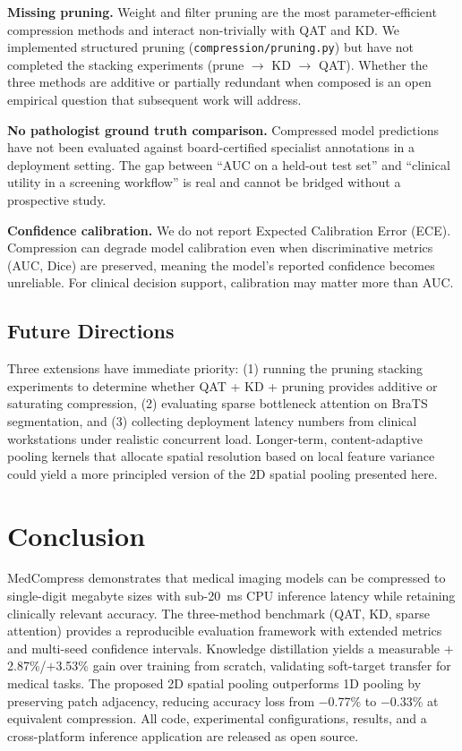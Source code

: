 \documentclass[10pt,twocolumn]{article}
\begin{document}
\textbf{Missing pruning.} Weight and filter pruning are the most parameter-efficient compression methods and interact non-trivially with QAT and KD. We implemented structured pruning (\texttt{compression/pruning.py}) but have not completed the stacking experiments (prune $\rightarrow$ KD $\rightarrow$ QAT). Whether the three methods are additive or partially redundant when composed is an open empirical question that subsequent work will address.

\textbf{No pathologist ground truth comparison.} Compressed model predictions have not been evaluated against board-certified specialist annotations in a deployment setting. The gap between ``AUC on a held-out test set'' and ``clinical utility in a screening workflow'' is real and cannot be bridged without a prospective study.

\textbf{Confidence calibration.} We do not report Expected Calibration Error (ECE). Compression can degrade model calibration even when discriminative metrics (AUC, Dice) are preserved, meaning the model's reported confidence becomes unreliable. For clinical decision support, calibration may matter more than AUC.

\subsection{Future Directions}

Three extensions have immediate priority: (1) running the pruning stacking experiments to determine whether QAT + KD + pruning provides additive or saturating compression, (2) evaluating sparse bottleneck attention on BraTS segmentation, and (3) collecting deployment latency numbers from clinical workstations under realistic concurrent load. Longer-term, content-adaptive pooling kernels that allocate spatial resolution based on local feature variance could yield a more principled version of the 2D spatial pooling presented here.

\section{Conclusion}
\label{sec:conclusion}

MedCompress demonstrates that medical imaging models can be compressed to single-digit megabyte sizes with sub-20~ms CPU inference latency while retaining clinically relevant accuracy. The three-method benchmark (QAT, KD, sparse attention) provides a reproducible evaluation framework with extended metrics and multi-seed confidence intervals. Knowledge distillation yields a measurable $+$2.87\%/$+$3.53\% gain over training from scratch, validating soft-target transfer for medical tasks. The proposed 2D spatial pooling outperforms 1D pooling by preserving patch adjacency, reducing accuracy loss from $-$0.77\% to $-$0.33\% at equivalent compression. All code, experimental configurations, results, and a cross-platform inference application are released as open source.


\end{document}
